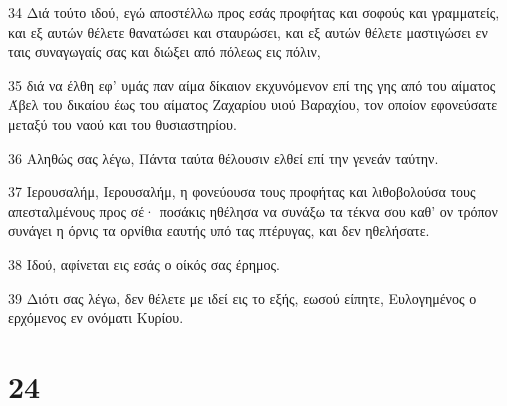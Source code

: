 \par 34 Διά τούτο ιδού, εγώ αποστέλλω προς εσάς προφήτας και σοφούς και γραμματείς, και εξ αυτών θέλετε θανατώσει και σταυρώσει, και εξ αυτών θέλετε μαστιγώσει εν ταις συναγωγαίς σας και διώξει από πόλεως εις πόλιν,
\par 35 διά να έλθη εφ' υμάς παν αίμα δίκαιον εκχυνόμενον επί της γης από του αίματος Άβελ του δικαίου έως του αίματος Ζαχαρίου υιού Βαραχίου, τον οποίον εφονεύσατε μεταξύ του ναού και του θυσιαστηρίου.
\par 36 Αληθώς σας λέγω, Πάντα ταύτα θέλουσιν ελθεί επί την γενεάν ταύτην.
\par 37 Ιερουσαλήμ, Ιερουσαλήμ, η φονεύουσα τους προφήτας και λιθοβολούσα τους απεσταλμένους προς σέ· ποσάκις ηθέλησα να συνάξω τα τέκνα σου καθ' ον τρόπον συνάγει η όρνις τα ορνίθια εαυτής υπό τας πτέρυγας, και δεν ηθελήσατε.
\par 38 Ιδού, αφίνεται εις εσάς ο οίκός σας έρημος.
\par 39 Διότι σας λέγω, δεν θέλετε με ιδεί εις το εξής, εωσού είπητε, Ευλογημένος ο ερχόμενος εν ονόματι Κυρίου.

\chapter{24}

